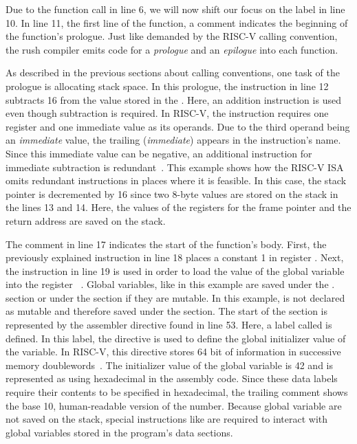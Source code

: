 Due to the function call in line 6, we will now shift our focus on the  label in line 10.
In line 11, the first line of the  function, a comment indicates the beginning of the function's prologue.
Just like demanded by the RISC-V calling convention, the rush compiler emits code for a \emph{prologue} and an \emph{epilogue} into each function.

As described in the previous sections about calling conventions, one task of the prologue is allocating stack space.
In this prologue, the  instruction in line 12 subtracts 16 from the value stored in the .
Here, an addition instruction is used even though subtraction is required.
In RISC-V, the  instruction requires one register and one immediate value as its operands.
Due to the third operand being an \emph{immediate} value, the trailing  (\emph{immediate}) appears in the instruction's name.
Since this immediate value can be negative, an additional instruction for immediate subtraction is redundant~\cite[reference]{Patterson2017}.
This example shows how the RISC-V ISA omits redundant instructions in places where it is feasible.
In this case, the stack pointer is decremented by 16 since two 8-byte values are stored on the stack in the lines 13 and 14.
Here, the values of the registers for the frame pointer and the return address are saved on the stack.

The comment in line 17 indicates the start of the function's body.
First, the previously explained  instruction in line 18 places a constant 1 in register .
Next, the  instruction in line 19 is used in order to load the value of the global variable  into the register ~\cite[reference]{Patterson2017}.
Global variables, like  in this example are saved under the . section or under the  section if they are mutable.
In this example,  is not declared as mutable and therefore saved under the  section.
The start of the  section is represented by the  assembler directive found in line 53.
Here, a label called  is defined.
In this label, the  directive is used to define the global initializer value of the variable.
In RISC-V, this directive stores 64 bit of information in successive memory doublewords~\cite[p.~39]{Patterson2017}.
The initializer value of the global variable is 42 and is represented as  using hexadecimal in the assembly code.
Since these data labels require their contents to be specified in hexadecimal, the trailing comment shows the base 10, human-readable version of the number.
Because global variable are not saved on the stack, special instructions like  are required to interact with global variables stored in the program's data sections.

